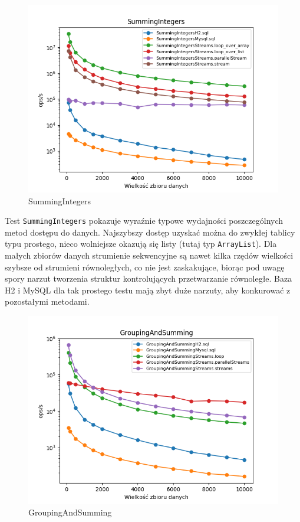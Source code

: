\documentclass[12pt,twoside,openright]{extarticle}
\begin{document}
\begin{figure}[H]
\centering
\includegraphics[width=15cm]{plots/SummingIntegers}
\caption{SummingIntegers}
\end{figure}

    Test \texttt{SummingIntegers} pokazuje wyraźnie typowe wydajności poszczególnych metod dostępu do danych. Najszybszy dostęp uzyskać można do zwykłej tablicy typu prostego, nieco wolniejsze okazują się listy (tutaj typ \texttt{ArrayList}). Dla małych zbiorów danych strumienie sekwencyjne są nawet kilka rzędów wielkości szybsze od strumieni równoległych, co nie jest zaskakujące, biorąc pod uwagę spory narzut tworzenia struktur kontrolujących przetwarzanie równoległe. Baza H2 i MySQL dla tak prostego testu mają zbyt duże narzuty, aby konkurować z pozostałymi metodami.

\newpage
\begin{figure}[H]
\centering
\includegraphics[width=15cm]{plots/GroupingAndSumming}
\caption{GroupingAndSumming}
\end{figure}
\end{document}
